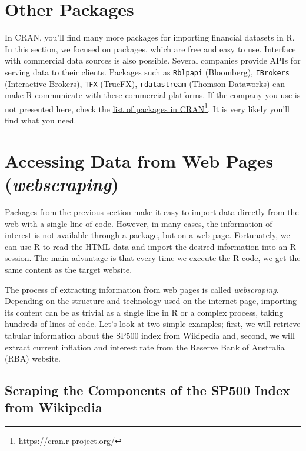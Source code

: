 \documentclass[
  12pt,
]{book}
\begin{document}
\hypertarget{other-packages}{%
\section{Other Packages}\label{other-packages}}

In CRAN, you'll find many more packages for importing financial datasets in R. In this section, we focused on packages, which are free and easy to use. Interface with commercial data sources is also possible. Several companies provide APIs for serving data to their clients. Packages such as \texttt{Rblpapi} (Bloomberg), \texttt{IBrokers} (Interactive Brokers), \texttt{TFX} (TrueFX), \texttt{rdatastream} (Thomson Dataworks) can make R communicate with these commercial platforms. If the company you use is not presented here, check the \href{https://cran.r-project.org/}{list of packages in CRAN}\footnote{\url{https://cran.r-project.org/}}. It is very likely you'll find what you need.

\hypertarget{accessing-data-from-web-pages-webscraping}{%
\section{\texorpdfstring{Accessing Data from Web Pages (\emph{webscraping})}{Accessing Data from Web Pages (webscraping)}}\label{accessing-data-from-web-pages-webscraping}}

Packages from the previous section make it easy to import data directly from the web with a single line of code. However, in many cases, the information of interest is not available through a package, but on a web page. Fortunately, we can use R to read the HTML data and import the desired information into an R session. The main advantage is that every time we execute the R code, we get the same content as the target website.

The process of extracting information from web pages is called \emph{webscraping}. Depending on the structure and technology used on the internet page, importing its content can be as trivial as a single line in R or a complex process, taking hundreds of lines of code. Let's look at two simple examples; first, we will retrieve tabular information about the SP500 index from Wikipedia and, second, we will extract current inflation and interest rate from the Reserve Bank of Australia (RBA) website. 

\hypertarget{scraping-the-components-of-the-sp500-index-from-wikipedia}{%
\subsection{Scraping the Components of the SP500 Index from Wikipedia}\label{scraping-the-components-of-the-sp500-index-from-wikipedia}}
\end{document}
